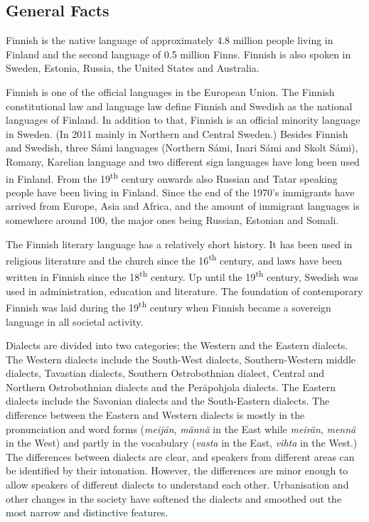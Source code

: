\begin{multicols}{2}
\subsection{General Facts}

Finnish is the native language of approximately 4.8 million people living in Finland and the second language of 0.5 million Finns. Finnish is also spoken in Sweden, Estonia, Russia, the United States and Australia.  


Finnish is one of the official languages in the European Union. The Finnish constitutional law and language law define Finnish and Swedish as the national languages of Finland. In addition to that, Finnish is an official minority language in Sweden. (In 2011 mainly in Northern and Central Sweden.) Besides Finnish and Swedish, three Sámi languages (Northern Sámi, Inari Sámi and Skolt Sámi), Romany, Karelian language and two different sign languages have long been used in Finland. From the 19\textsuperscript{th} century onwards also Russian and Tatar speaking people have been living in Finland. Since the end of the 1970’s immigrants have arrived from Europe, Asia and Africa, and the amount of immigrant languages is somewhere around 100, the major ones being Russian, Estonian and Somali.

The Finnish literary language has a relatively short history. It has been used in religious literature and the church since the 16\textsuperscript{th} century, and laws have been written in Finnish since the 18\textsuperscript{th} century. Up until the 19\textsuperscript{th} century, Swedish was used in administration, education and literature. The foundation of contemporary Finnish was laid during the 19\textsuperscript{th} century when Finnish became a sovereign language in all societal activity.

Dialects are divided into two categories; the Western and the Eastern dialects. The Western dialects include the South-West dialects, Southern-Western middle dialects, Tavastian dialects, Southern Ostrobothnian dialect, Central and Northern Ostrobothnian dialects and the Peräpohjola dialects. The Eastern dialects include the Savonian dialects and the South-Eastern dialects. The difference between the Eastern and Western dialects is mostly in the pronunciation and word forms
 (\textit{\foreignlanguage{finnish}{\textit{meijän}}},
  \textit{\foreignlanguage{finnish}{\textit{männä}}} in the East while
  \textit{\foreignlanguage{finnish}{\textit{meirän}}},
  \textit{\foreignlanguage{finnish}{\textit{mennä}}} in the West)
and partly in the vocabulary
 (\textit{\foreignlanguage{finnish}{\textit{vasta}}} in the East,
 \textit{\foreignlanguage{finnish}{\textit{vihta}}} in the West.)  The differences between dialects are clear, and speakers from different areas can be identified by their intonation. However, the differences are minor enough to allow speakers of different dialects to understand each other. Urbanisation and other changes in the society have softened the dialects and smoothed out the most narrow and distinctive features.


\end{multicols}
